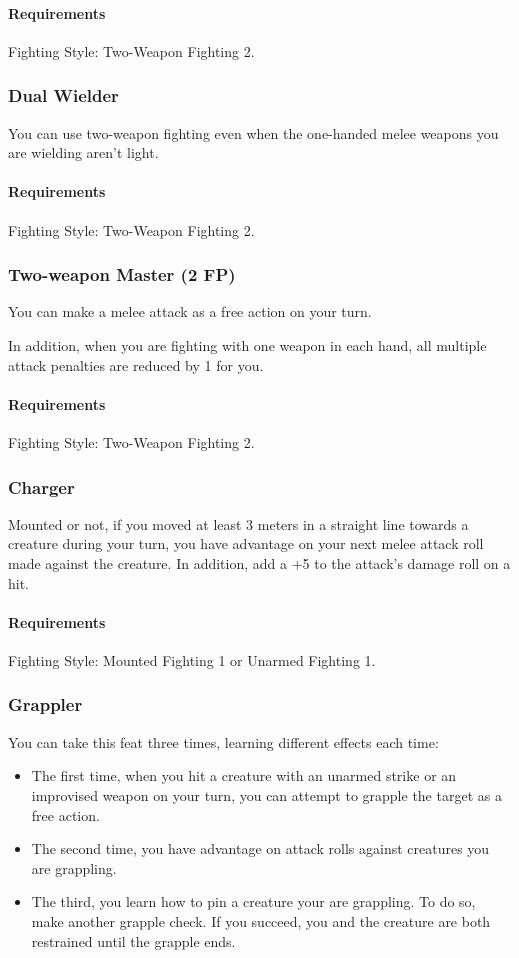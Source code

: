     \paragraph{Requirements} Fighting Style: Two-Weapon Fighting 2.
\subsubsection{Dual Wielder} \label{feat::dualwielder}
    You can use two-weapon fighting even when the one-handed melee weapons you are wielding aren't light.
    \paragraph{Requirements} Fighting Style: Two-Weapon Fighting 2.
\subsubsection{Two-weapon Master (2 FP)} \label{feat::twoweaponmaster}
    You can make a melee attack as a free action on your turn.

    In addition, when you are fighting with one weapon in each hand, all multiple attack penalties are reduced by 1 for you.
    \paragraph{Requirements} Fighting Style: Two-Weapon Fighting 2.
\subsubsection{Charger} \label{feat::charger}
    Mounted or not, if you moved at least 3 meters in a straight line towards a creature during your turn, you have advantage on your next melee attack roll made against the creature.
    In addition, add a +5 to the attack's damage roll on a hit.
    \paragraph{Requirements} Fighting Style: Mounted Fighting 1 or Unarmed Fighting 1.
\subsubsection{Grappler} \label{feat::grappler}
    You can take this feat three times, learning different effects each time:
    \begin{itemize}
        \item The first time, when you hit a creature with an unarmed strike or an improvised weapon on your turn, you can attempt to grapple the target as a free action.
        \item The second time, you have advantage on attack rolls against creatures you are grappling.
        \item The third, you learn how to pin a creature your are grappling.
        To do so, make another grapple check.
        If you succeed, you and the creature are both restrained until the grapple ends.
    \end{itemize}
